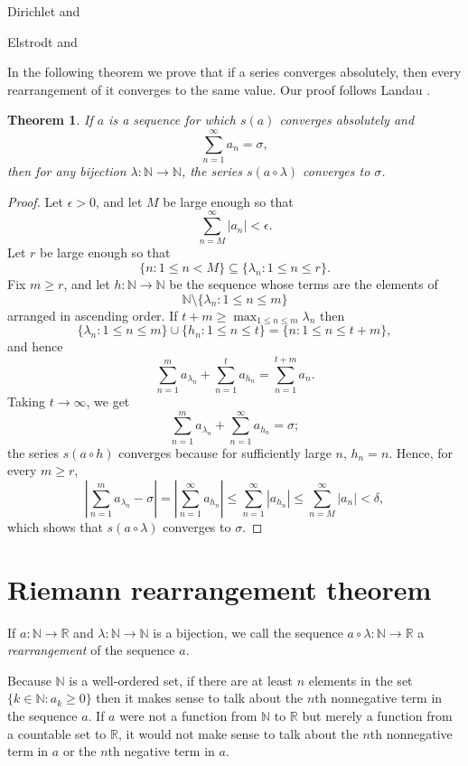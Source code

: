 \documentclass{article}
\newtheorem{theorem}{Theorem}
\begin{document}
Dirichlet \cite{dirichlet} and \cite[p.~176, \S 101]{dedekind}


Elstrodt \cite{elstrodt} and \cite{MR1613384}

In the following theorem we prove that if a series converges absolutely, then every rearrangement of it converges to the same
value. Our proof follows Landau \cite[p.~157, Theorem 216]{landau}.

\begin{theorem}
If $a$ is a sequence for which $s(a)$ converges absolutely and 
\[
\sum_{n=1}^\infty a_n = \sigma,
\]
then for any bijection $\lambda:\mathbb{N} \to \mathbb{N}$, the series $s(a \circ \lambda)$ converges to
$\sigma$.
\end{theorem}
\begin{proof}
Let $\epsilon>0$, and let $M$ be large enough so that
\[
\sum_{n=M}^\infty |a_n|<\epsilon.
\]
Let $r$ be large enough so that
\[
\{n: 1 \leq n <M\} \subseteq \{\lambda_n: 1 \leq n \leq r\}.
\]
Fix $m \geq r$, and
let $h:\mathbb{N} \to \mathbb{N}$ be the sequence whose terms are the elements of
\[
\mathbb{N} \setminus \{\lambda_n: 1 \leq n \leq m\}
\]
arranged in ascending order. If $t+m \geq \max_{1 \leq n \leq m} \lambda_n$ then 
\[
\{\lambda_n: 1 \leq n \leq m\} \cup \{h_n: 1 \leq n \leq t\} = \{n: 1 \leq n \leq t+m\},
\]
and hence
\[
\sum_{n=1}^m a_{\lambda_n} + \sum_{n=1}^t a_{h_n} = \sum_{n=1}^{t+m} a_n.
\]
Taking $t \to \infty$, we get
\[
\sum_{n=1}^m a_{\lambda_n} + \sum_{n=1}^\infty a_{h_n} = \sigma;
\]
the series $s(a \circ h)$ converges because for sufficiently large $n$, $h_n=n$.
Hence, for every $m \geq r$,
\[
\left| \sum_{n=1}^m a_{\lambda_n} - \sigma \right| = \left| \sum_{n=1}^\infty a_{h_n} \right|
\leq \sum_{n=1}^\infty |a_{h_n}| \leq \sum_{n=M}^\infty |a_n| < \delta,
\]
which shows that $s(a \circ \lambda)$ converges to $\sigma$.
\end{proof}


\section{Riemann rearrangement theorem}
If $a:\mathbb{N} \to \mathbb{R}$ and $\lambda:\mathbb{N} \to \mathbb{N}$ is a bijection,
we call the sequence $a \circ \lambda:\mathbb{N} \to \mathbb{R}$ a {\em rearrangement} of the sequence $a$.

Because $\mathbb{N}$ is a well-ordered set, if there are at least $n$ elements in the set $\{k \in \mathbb{N}: a_k \geq 0\}$ then it makes
sense to talk about the $n$th nonnegative term in the sequence $a$. If $a$ were not a function from $\mathbb{N}$ to $\mathbb{R}$ but merely
a function from a countable set to $\mathbb{R}$, it would not make sense to talk about the $n$th nonnegative term in $a$ or the $n$th negative
term in $a$.
\end{document}
